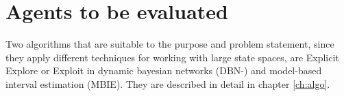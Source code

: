 \section{Agents to be evaluated}

Two algorithms that are suitable to the purpose and problem statement, since they apply different techniques for working with large state spaces, are Explicit Explore or Exploit in dynamic bayesian networks (DBN-\etre) and model-based interval estimation (MBIE). They are described in detail in chapter \ref{ch:algo}. 
